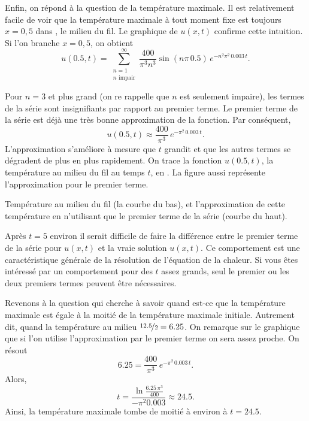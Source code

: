 \begin{example}
Enfin,  on répond à la question de la température maximale.  Il est
relativement facile de voir
que la température maximale à tout moment fixe est toujours $ x = 0,5 $ dans ,
le milieu du fil.  Le graphique de $ u (x, t) $ confirme cette intuition.
Si l'on branche $ x = 0,5 $,  on obtient
\begin{equation*}
u(0.5,t) = 
\sum_{\substack{n=1 \\ n \text{ impair}}}^\infty
\frac{400}{\pi^3 n^3}
\sin (n \pi\, 0.5 )
\, e^{-n^2 \pi^2 \, 0.003 \, t} .
\end{equation*}

Pour $n=3$ et plus grand (on re rappelle que $n$ est seulement impaire),  les termes
de la série
sont insignifiants par rapport au premier terme.
Le premier terme de la série est déjà une très bonne approximation
de la fonction.
Par conséquent,
\begin{equation*}
u(0.5,t) \approx
\frac{400}{\pi^3}
\, e^{-\pi^2 \, 0.003 \, t} .
\end{equation*}
L'approximation s'améliore à mesure que $ t $ grandit et que les autres
termes se dégradent de plus en plus rapidement.
On trace la fonction $ u (0.5, t) $,  la température au milieu du fil
au temps $ t $,  en .  La figure aussi
représente l'approximation pour le premier terme.

\begin{myfig}
\capstart
{}
\caption{Température au milieu du fil (la courbe du bas),
et l'approximation de cette température en n'utilisant que le premier terme de
la série (courbe du haut). \label{heat:wireexmaxfig}}
\end{myfig}

Après $ t = 5 $ environ
il serait difficile de faire la différence
entre le premier terme de la série pour $ u (x, t) $ et
la vraie solution $ u (x, t) $.  Ce comportement
est une caractéristique générale de la résolution de l'équation de la chaleur.
Si vous êtes intéressé par un comportement pour des $ t $ assez grands,  seul le
premier ou les deux premiers termes peuvent être nécessaires.


Revenons à la question qui cherche à savoir quand est-ce que la température maximale est égale à la moitié de la
température maximale initiale.  Autrement dit,  quand la température
au milieu $\nicefrac{12.5}{2} = 6.25$.  On remarque sur le graphique que si l'on utilise
l'approximation par le premier terme on sera assez proche.  On résout 
\begin{equation*}
6.25 =
\frac{400}{\pi^3}
\, e^{-\pi^2 \, 0.003 \, t} .
\end{equation*}
Alors,
\begin{equation*}
t =
\frac{\ln \frac{6.25\,\pi^3}{400}}{-\pi^2 0.003}
\approx 24.5 .
\end{equation*}
Ainsi, la température maximale tombe de moitié à environ à $t=24.5$.
\end{example}


